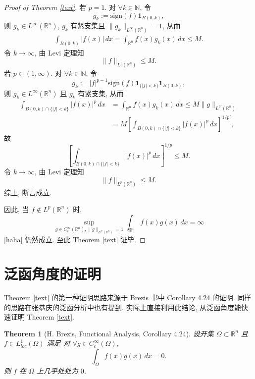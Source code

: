 \documentclass[a4paper,11pt]{article}
\newtheorem{theorem}{Theorem}[section]
\theoremstyle{definition}
\begin{document}
\begin{proof}[Proof of Theorem \ref{text}]
若 $ p = 1 $. 对 $ \forall k \in \mathbb{N} $, 令
$$
g_k := \mathrm{sign} (f) \mathbf{1}_{B(0, k)},
$$
则 $ g_k \in L^\infty(\mathbb{R}^n) $, $ g_k $ 有紧支集且 $ \|g_k\|_{L^\infty(\mathbb{R}^n)} = 1 $, 从而
\begin{align*}
\int_{B(0, k)} |f(x)| \, dx
= \int_{\mathbb{R}^n} f(x) g_k(x) \, dx
\leq M.
\end{align*}
令 $ k \to \infty $, 由 Levi 定理知
$$
\| f \|_{L^1(\mathbb{R}^n)} \leq M.
$$
若 $ p \in (1, \infty) $. 对 $ \forall k \in \mathbb{N} $, 令
$$
g_k := |f|^{p-1} \mathrm{sign}(f) \mathbf{1}_{\{|f| < k\}} \mathbf{1}_{B(0, k)},
$$
则 $ g_k \in L^\infty(\mathbb{R}^n) $ 且 $ g_k $ 有紧支集, 从而
\begin{align*}
\int_{B(0, k) \cap \{|f| < k\}} |f(x)|^p \, dx
&= \int_{\mathbb{R}^n} f(x) g_k(x) \, dx
\leq M \| g \|_{L^{p'}(\mathbb{R}^n)} \\
&= M \left[ \int_{B(0, k) \cap \{|f| < k\}} |f(x)|^p \, dx \right]^{1/p'},
\end{align*}
故
$$
\left[ \int_{B(0, k) \cap \{|f| < k\}} |f(x)|^p \, dx \right]^{1/p} \leq M.
$$
令 $ k \to \infty $, 由 Levi 定理知
$$
\| f \|_{L^p(\mathbb{R}^n)} \leq M.
$$
综上, 断言成立.

因此, 当 $ f \notin L^p(\mathbb{R}^n) $ 时,
$$
\sup_{g \in C_c^\infty(\mathbb{R}^n), \| g \|_{L^{p'}(\mathbb{R}^n)} = 1}
\int_{\mathbb{R}^n} f(x) g(x) \, dx = \infty
$$
\eqref{haha} 仍然成立. 至此 Theorem \ref{text} 证毕.
\end{proof}

\section{泛函角度的证明}

Theorem \ref{text} 的第一种证明思路来源于 Brezis 书中 Corollary 4.24 的证明. 同样的思路在张恭庆的泛函分析中也有提到.
实际上直接利用此结论, 从泛函角度能快速证明 Theorem \ref{text}.

\begin{theorem}[H. Brezis, Functional Analysis, Corollary 4.24] \label{h}
设开集 $ \Omega \subset \mathbb{R}^n $ 且 $ f \in L^1_{loc}(\Omega) $ 满足
对 $ \forall g \in C_c^\infty(\Omega) $,
$$
\int_\Omega f(x) g(x) \, dx = 0.
$$
则 $ f $ 在 $ \Omega $ 上几乎处处为 $ 0 $.
\end{theorem}
\end{document}
